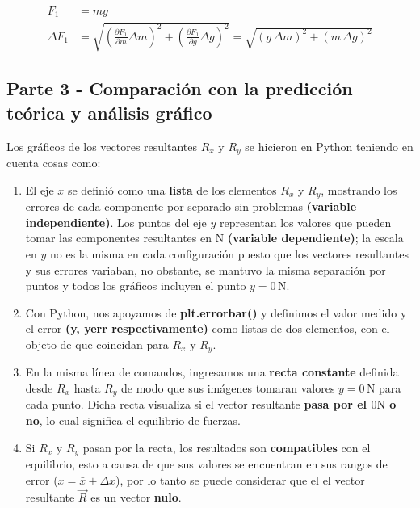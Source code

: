 \documentclass[12pt,a4paper]{article}
\begin{document}
\begin{align*}
    F_1 &= m g \\
    \Delta F_1 &= \sqrt{\left(\frac{\partial F_1}{\partial m}\Delta m\right)^2 + \left(\frac{\partial F_1}{\partial g}\Delta g\right)^2} = \sqrt{\left(g \, \Delta m\right)^2 + \left(m \, \Delta g\right)^2}
\end{align*}
\subsection{Parte 3 - Comparación con la predicción teórica y análisis gráfico} \label{Procedimiento-Parte-3}

Los gráficos de los vectores resultantes $R_x$ y $R_y$ se hicieron en Python teniendo en cuenta cosas como:

\begin{enumerate}[label=\alph*)]
\item El eje $x$ se definió como una \textbf{lista} de los elementos $R_x$ y $R_y$, mostrando los errores de cada componente por separado sin problemas \textbf{(variable independiente)}. Los puntos del eje $y$ representan los valores que pueden tomar las componentes resultantes en N \textbf{(variable dependiente)}; la escala en $y$ no es la misma en cada configuración puesto que los vectores resultantes y sus errores variaban, no obstante, se mantuvo la misma separación por puntos y todos los gráficos incluyen el punto $y = 0 \,\mathrm{N}$.
\item Con Python, nos apoyamos de \textbf{plt.errorbar()} y definimos el valor medido y el error \textbf{(y, yerr respectivamente)} como listas de dos elementos, con el objeto de que coincidan para $R_x$ y $R_y$.
\item En la misma línea de comandos, ingresamos una \textbf{recta constante} definida desde $R_x$ hasta $R_y$ de modo que sus imágenes tomaran valores $y = 0 \,\mathrm{N}$ para cada punto. Dicha recta visualiza si el vector resultante \textbf{pasa por el $0 \mathrm{N}$ o no}, lo cual significa el equilibrio de fuerzas.
\item Si $R_x$ y $R_y$ pasan por la recta, los resultados son \textbf{compatibles} con el equilibrio, esto a causa de que sus valores se encuentran en sus rangos de error ($x = \bar{x} \pm \Delta x$), por lo tanto se puede considerar que el el vector resultante $\vec{R}$ es un vector \textbf{nulo}.
\end{enumerate}

\newpage

\end{document}
